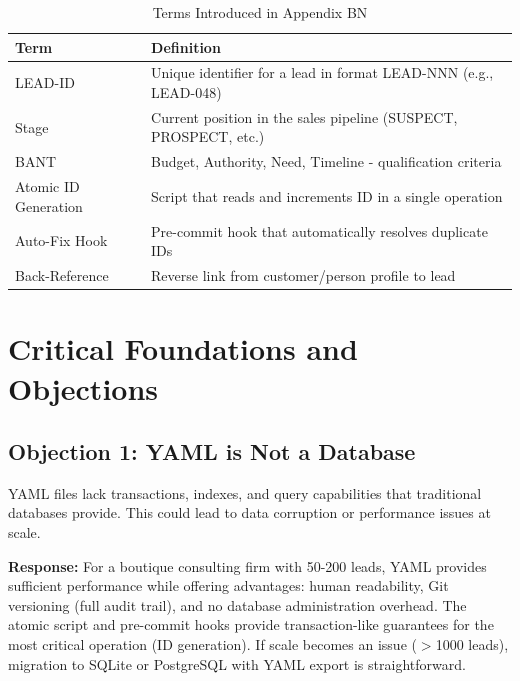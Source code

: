 \begin{table}[htbp]
\centering
\caption{Terms Introduced in Appendix BN}
\label{tab:bn-glossary}
\renewcommand{\arraystretch}{1.3}
\begin{tabular}{@{}p{3cm}p{9cm}@{}}
\toprule
\textbf{Term} & \textbf{Definition} \\
\midrule
LEAD-ID & Unique identifier for a lead in format LEAD-NNN (e.g., LEAD-048) \\
Stage & Current position in the sales pipeline (SUSPECT, PROSPECT, etc.) \\
BANT & Budget, Authority, Need, Timeline - qualification criteria \\
Atomic ID Generation & Script that reads and increments ID in a single operation \\
Auto-Fix Hook & Pre-commit hook that automatically resolves duplicate IDs \\
Back-Reference & Reverse link from customer/person profile to lead \\
\bottomrule
\end{tabular}
\end{table}


\section{Critical Foundations and Objections}
\label{sec:bn-foundations}

\subsection{Objection 1: YAML is Not a Database}

\begin{tcolorbox}[colback=red!5!white, colframe=red!50!black,
    title=Objection: YAML lacks database features]
YAML files lack transactions, indexes, and query capabilities that traditional databases provide. This could lead to data corruption or performance issues at scale.
\end{tcolorbox}

\textbf{Response:} For a boutique consulting firm with 50-200 leads, YAML provides sufficient performance while offering advantages: human readability, Git versioning (full audit trail), and no database administration overhead. The atomic script and pre-commit hooks provide transaction-like guarantees for the most critical operation (ID generation). If scale becomes an issue ($>$1000 leads), migration to SQLite or PostgreSQL with YAML export is straightforward.

